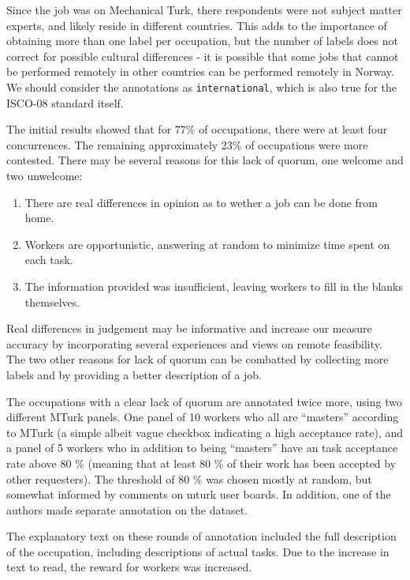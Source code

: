 \documentclass[11pt,]{article}
\providecommand{\tightlist}{%
  \setlength{\itemsep}{0pt}\setlength{\parskip}{0pt}}
\begin{document}
Since the job was on Mechanical Turk, there respondents were not subject
matter experts, and likely reside in different countries. This adds to
the importance of obtaining more than one label per occupation, but the
number of labels does not correct for possible cultural differences - it
is possible that some jobs that cannot be performed remotely in other
countries can be performed remotely in Norway. We should consider the
annotations as \texttt{international}, which is also true for the
ISCO-08 standard itself.

The initial results showed that for 77\% of occupations, there were at
least four concurrences. The remaining approximately 23\% of occupations
were more contested. There may be several reasons for this lack of
quorum, one welcome and two unwelcome:

\begin{enumerate}
\def\labelenumi{\arabic{enumi}.}
\tightlist
\item
  There are real differences in opinion as to wether a job can be done
  from home.
\item
  Workers are opportunistic, answering at random to minimize time spent
  on each task.
\item
  The information provided was insufficient, leaving workers to fill in
  the blanks themselves.
\end{enumerate}

Real differences in judgement may be informative and increase our
measure accuracy by incorporating several experiences and views on
remote feasibility. The two other reasons for lack of quorum can be
combatted by collecting more labels and by providing a better
description of a job.

The occupations with a clear lack of quorum are annotated twice more,
using two different MTurk panels. One panel of 10 workers who all are
``masters'' according to MTurk (a simple albeit vague checkbox
indicating a high acceptance rate), and a panel of 5 workers who in
addition to being ``masters'' have an task acceptance rate above 80 \%
(meaning that at least 80 \% of their work has been accepted by other
requesters). The threshold of 80 \% was chosen mostly at random, but
somewhat informed by comments on mturk user boards. In addition, one of
the authors made separate annotation on the dataset.

The explanatory text on these rounds of annotation included the full
description of the occupation, including descriptions of actual tasks.
Due to the increase in text to read, the reward for workers was
increased.
\end{document}
